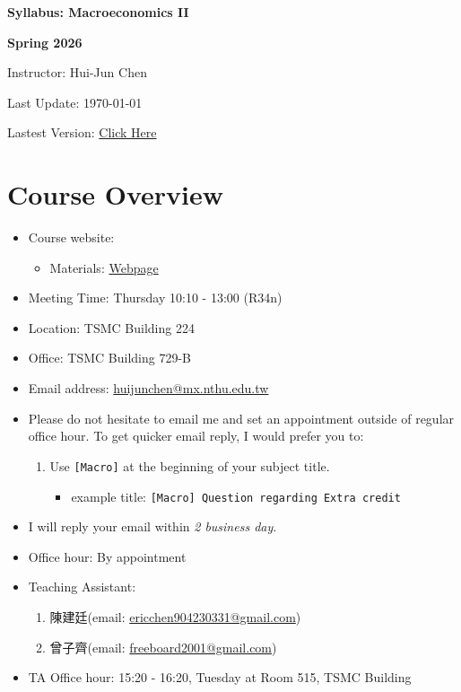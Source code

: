 \documentclass[12pt]{article}
\begin{document}
\centerline{\huge\bf Syllabus: Macroeconomics II}
\medskip
\centerline{\LARGE \bf Spring 2026}
\medskip
\centerline{\Large Instructor: Hui-Jun Chen}
\centerline{Last Update: \today}
\centerline{Lastest Version: \href{https://huijunchen9260.github.io/pdf/MacroeconomicsIISpring2026/syllabus/syllabus.pdf}{Click Here}}

\medskip



\section*{Course Overview}
\begin{itemize}

    \item Course website:
    \begin{itemize}

       \item Materials: \href{https://huijunchen9260.github.io/MacroeconomicsIISpring2026.html}{Webpage}
    \end{itemize}
    \item Meeting Time: Thursday 10:10 - 13:00 (R34n)
    \item Location: TSMC Building 224
    \item Office: TSMC Building 729-B
    \item Email address: \href{huijunchen@mx.nthu.edu.tw}{huijunchen@mx.nthu.edu.tw}
    \item Please do not hesitate to email me and set an appointment outside of regular office hour.
To get quicker email reply, I would prefer you to:
    \begin{enumerate}
        \item Use \texttt{[Macro]} at the beginning of your subject title.
\begin{itemize}
            \item example title: \texttt{[Macro] Question regarding Extra credit}
        \end{itemize}
    \end{enumerate}
    \item I will reply your email within \textit{2 business day}.
\item Office hour: By appointment
    \item Teaching Assistant:
    \begin{enumerate}
        \item 陳建廷(email: \href{ericchen904230331@gmail.com}{ericchen904230331@gmail.com})
        \item 曾子齊(email: \href{freeboard2001@gmail.com}{freeboard2001@gmail.com})
    \end{enumerate}
    \item TA Office hour: 15:20 - 16:20, Tuesday at Room 515, TSMC Building
\end{itemize}
\end{document}
